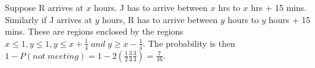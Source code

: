 \documentclass[../../probability-notes.tex]{subfile}
\begin{document}
Suppose R arrives at $x$ hours. J has to arrive between $x$ hrs to $x$ hrs + 15 mins. Similarly if J arrives at $y$ hours, R has to arrive between $y$ hours to $y$ hours + 15 mins. These are regions enclosed by the regions $x \leq 1, y \leq 1, y \leq x + \frac{1}{4} \;and\; y \geq x - \frac{1}{4}$. The probability is then $ 1 - P(not\;meeting) = 1 - 2(\frac{1}{2} \frac{3}{4} \frac{3}{4}) = \frac{7}{16}$.
\end{document}
